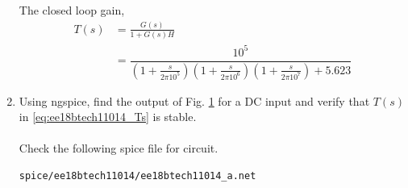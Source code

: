 \begin{enumerate}[label=\thesection.\arabic*.,ref=\thesection.\theenumi]
\begin{figure}[ht!]
	\begin{center}
		\resizebox{\columnwidth}{!}{}
	\end{center}
	\caption{}
	\label{fig:ee18btech11014_Closed-Loop Circuit}
\end{figure}

%
%
%
%
The closed loop gain,
\begin{align}
T(s) &= \frac{G(s)}{1+G(s)H}
\\
&=\dfrac{10^5}{\left(1+\frac{s}{2\pi 10^{5}}\right)\left(1+\frac{s}{2\pi 10^{6}}\right)\left(1+\frac{s}{2\pi 10^{7}}\right)+5.623}
\label{eq:ee18btech11014_Ts}
\end{align}
\item Using ngspice, find the output of Fig. \ref{fig:ee18btech11014_Closed-Loop Circuit} for a DC input and verify that $T(s)$ in \eqref{eq:ee18btech11014_Ts} is stable.\\
\solution\\
Check the following spice file for circuit.
\begin{lstlisting}
spice/ee18btech11014/ee18btech11014_a.net
\end{lstlisting}


\end{enumerate}
